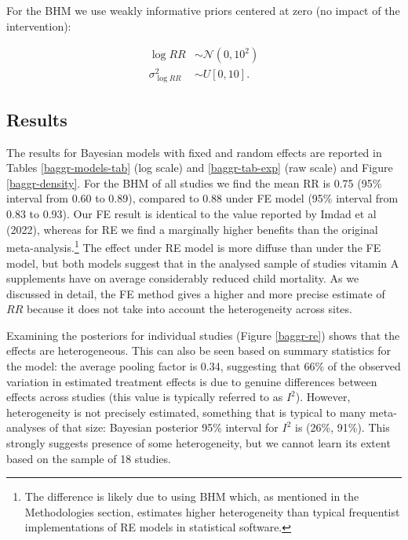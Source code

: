 \documentclass[12pt]{article}
\begin{document}
For the BHM we use weakly informative priors centered at zero (no impact of the intervention):

\begin{equation} \label{lognormal priors}
\begin{aligned}
\log{RR} &\sim  \mathcal{N}(0,10^2) \\
\sigma^2_{\log{RR}} &\sim U[0,10].
\end{aligned}
\end{equation}



\subsection{ Results  }


The results for Bayesian models with fixed and random effects are reported in Tables \ref{baggr-models-tab} (log scale) and \ref{baggr-tab-exp} (raw scale) and Figure \ref{baggr-density}. For the BHM of all studies we find the mean RR is 0.75 (95\% interval from 0.60 to 0.89), compared to 0.88 under FE model (95\% interval from 0.83 to 0.93). Our FE result is identical to the value reported by Imdad et al (2022), whereas for RE we find a marginally higher benefits than the original meta-analysis.\footnote{The difference is likely due to using BHM which, as mentioned in the Methodologies section, estimates higher heterogeneity than typical frequentist implementations of RE models in statistical software.}
The effect under RE model is more diffuse than under the FE model, but both models suggest that in the analysed sample of studies vitamin A supplements have on average considerably reduced child mortality. As we discussed in detail, the FE method gives a higher and more precise estimate of $RR$ because it does not take into account the heterogeneity across sites. 

Examining the posteriors for individual studies (Figure \ref{baggr-re}) shows that the effects are heterogeneous. This can also be seen based on summary statistics for the model: the average pooling factor is 0.34, suggesting that 66\% of the observed variation in estimated treatment effects is due to genuine differences between effects across studies (this value is typically referred to as $I^2$). However, heterogeneity is not precisely estimated, something that is typical to many meta-analyses of that size: Bayesian posterior 95\% interval for $I^2$ is (26\%, 91\%). This strongly suggests presence of some heterogeneity, but we cannot learn its extent based on the sample of 18 studies.
\end{document}
